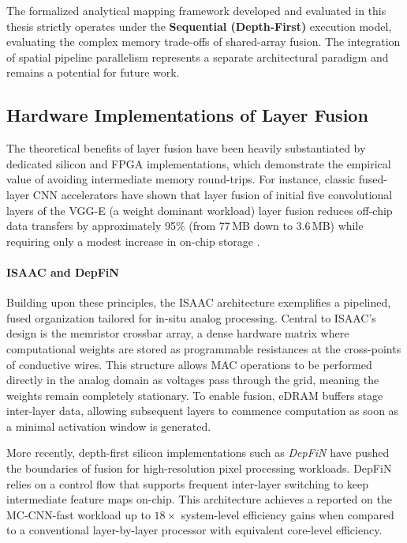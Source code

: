 The formalized analytical mapping framework developed and evaluated in this thesis strictly operates under the \textbf{Sequential (Depth-First)} execution model, evaluating the complex memory trade-offs of shared-array fusion. The integration of spatial pipeline parallelism represents a separate architectural paradigm and remains a potential for future work.
\subsection{Hardware Implementations of Layer Fusion}

The theoretical benefits of layer fusion have been heavily substantiated by dedicated silicon and FPGA implementations, which demonstrate the empirical value of avoiding intermediate memory round-trips. For instance, classic fused-layer CNN accelerators have shown that layer fusion of initial five convolutional layers of the VGG-E (a weight dominant workload) layer fusion reduces off-chip data transfers by approximately 95\% (from 77\,MB down to 3.6\,MB) while requiring only a modest increase in on-chip storage \cite{alwani2016fusedlayer}.

\paragraph{ISAAC and DepFiN}

Building upon these principles, the ISAAC \cite{shafiee2016isaac} architecture exemplifies a pipelined, fused organization tailored for in-situ analog processing. Central to ISAAC's design is the memristor crossbar array, a dense hardware matrix where computational weights are stored as programmable resistances at the cross-points of conductive wires. This structure allows MAC operations to be performed directly in the analog domain as voltages pass through the grid, meaning the weights remain completely stationary. To enable fusion, eDRAM buffers stage inter-layer data, allowing subsequent layers to commence computation as soon as a minimal activation window is generated.

More recently, depth-first silicon implementations such as \emph{DepFiN} \cite{goetschalckx2023depfin} have pushed the boundaries of fusion for high-resolution pixel processing workloads. DepFiN relies on a control flow that supports frequent inter-layer switching to keep intermediate feature maps on-chip. This architecture achieves a reported on the MC-CNN-fast workload up to $18\times$ system-level efficiency gains when compared to a conventional layer-by-layer processor with equivalent core-level efficiency. 

